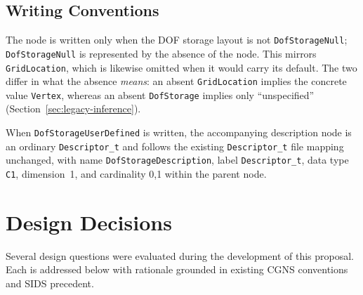 \documentclass[11pt,letterpaper]{article}
\begin{document}
\subsection{Writing Conventions}

The node is written only when the DOF storage layout is not
\texttt{DofStorageNull}; \texttt{DofStorageNull} is represented by the
absence of the node.  This mirrors \texttt{GridLocation}, which is
likewise omitted when it would carry its default.  The two differ in
what the absence \emph{means}: an absent \texttt{GridLocation} implies
the concrete value \texttt{Vertex}, whereas an absent
\texttt{DofStorage} implies only ``unspecified''
(Section~\ref{sec:legacy-inference}).

When \texttt{DofStorageUserDefined} is written, the accompanying
description node is an ordinary \texttt{Descriptor\_t} and follows
the existing \texttt{Descriptor\_t} file mapping unchanged, with
name \texttt{DofStorageDescription}, label
\texttt{Descriptor\_t}, data type \texttt{C1}, dimension~1, and
cardinality 0,1 within the parent node.

\section{Design Decisions}

Several design questions were evaluated during the development
of this proposal.  Each is addressed below with rationale grounded in
existing CGNS conventions and SIDS precedent.
\end{document}
